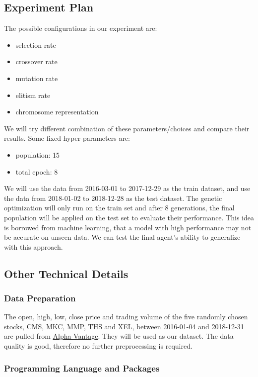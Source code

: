 \documentclass{article}
\begin{document}
\subsection{Experiment Plan}

The possible configurations in our experiment are:
\begin{itemize}
	\item selection rate
	\item crossover rate
	\item mutation rate
	\item elitism rate
	\item chromosome representation
\end{itemize}

We will try different combination of these parameters/choices and compare their results.
Some fixed hyper-parameters are:
\begin{itemize}
	\item population: 15
	\item total epoch: 8
\end{itemize}

We will use the data from 2016-03-01 to 2017-12-29 as the train dataset,
and use the data from 2018-01-02 to 2018-12-28 as the test dataset.
The genetic optimization will only run on the train set and after 8 generations,
the final population will be applied on the test set to evaluate their performance.
This idea is borrowed from machine learning,
that a model with high performance may not be accurate on unseen data.
We can test the final agent's ability to generalize with this approach.

\subsection{Other Technical Details}

\subsubsection{Data Preparation}

The open, high, low, close price and trading volume
of the five randomly chosen stocks, CMS, MKC, MMP, THS and XEL,
between 2016-01-04 and 2018-12-31 are pulled from \href{https://www.alphavantage.co/}{Alpha Vantage}.
They will be used as our dataset.
The data quality is good, therefore no further preprocessing is required.

\subsubsection{Programming Language and Packages}
\end{document}
